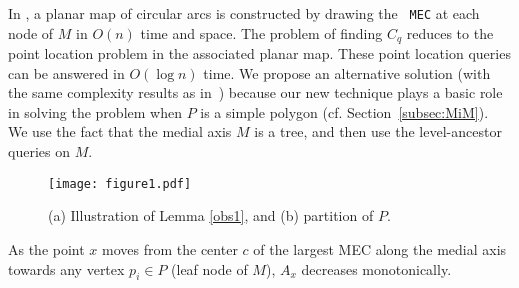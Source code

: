 \documentclass[12pt]{llncs}
\begin{document}
In \cite{BCOY01}, a planar map of circular arcs is constructed by drawing the {\tt 
MEC} at 
each node of $M$ in $O(n)$ time and space.
The problem of finding $C_q$ reduces to the point location problem in
the associated planar map.  These point location queries can be answered in  $O(\log 
n)$ 
time. We propose an 
alternative solution (with the same complexity results as in\ \cite{BCOY01})  because our new technique plays a basic role in solving 
the problem when $P$ is a simple 
polygon (cf.  Section\ \ref{subsec:MiM}). We use the fact that the medial 
axis 
$M$
is a tree, and then use the level-ancestor queries \cite{BF04} on $M$. \begin{figure}
[thb]
\centering  
\texttt{[image: figure1.pdf]}
  \caption{(a) Illustration of Lemma \ref{obs1}, and  (b)
partition of $P$.}
  \label{fig:figure1}
\end{figure}

\begin{lemma}\cite{BCOY01} \label{obs1}
As the point $x$ moves from the center $c$ of the largest MEC  along the medial axis 
towards any
vertex $p_i \in P$ (leaf node of $M$), $A_x$ decreases
monotonically.
\end{lemma}
\end{document}
